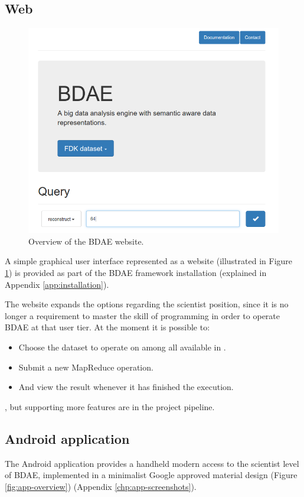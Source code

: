 \subsection{Web}
\begin{figure}[h!]
	\centering
	\includegraphics[scale=0.33]{img/website.png}
	\caption{Overview of the BDAE website. \label{fig:website}}
\end{figure}

A simple graphical user interface represented as a website (illustrated in Figure \ref{fig:website}) is provided as part of the BDAE framework installation (explained in Appendix \ref{app:installation}). 
\clearpage

The website expands the options regarding the scientist position, since it is no longer a requirement to master the skill of programming in order to operate BDAE at that user tier. At the moment it is possible to:
\begin{itemize}
	\item Choose the dataset to operate on among all available in \CodeName.
	\item Submit a new MapReduce operation.
	\item And view the result whenever it has finished the execution.
\end{itemize}
, but supporting more features are in the project pipeline.

\subsection{Android application} \label{sec:bdaeapp}
The Android application provides a handheld modern access to the scientist level of BDAE, implemented in a minimalist Google approved material design \cite{PageMaterialDesign} (Figure \ref{fig:app-overview}) (Appendix \ref{chp:app-screenshots}).
\newline

